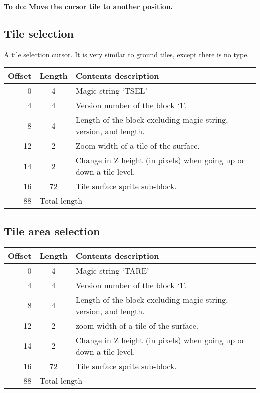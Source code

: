 \documentclass{article}
\begin{document}
\textbf{To do: Move the cursor tile to another position.}

\subsection{Tile selection}
A tile selection cursor. It is very similar to ground tiles, except there is
no type.

\begin{center}
\begin{tabular}{|r|c|l|} \hline
\textbf{Offset} & \textbf{Length} & \textbf{Contents description} \\ \hline
   0 &  4 & Magic string `TSEL' \\
   4 &  4 & Version number of the block `1'. \\
   8 &  4 & Length of the block excluding magic string, version, and length. \\
  12 &  2 & Zoom-width of a tile of the surface. \\
  14 &  2 & Change in Z height (in pixels) when going up or down a tile level. \\
  16 & 72 & Tile surface sprite sub-block. \\ \hline
  88 & \multicolumn{2}{l|}{Total length} \\ \hline
\end{tabular}
\end{center}

\subsection{Tile area selection}
\begin{center}
\begin{tabular}{|r|c|l|} \hline
\textbf{Offset} & \textbf{Length} & \textbf{Contents description} \\ \hline
   0 &  4 & Magic string `TARE' \\
   4 &  4 & Version number of the block `1'. \\
   8 &  4 & Length of the block excluding magic string, version, and length. \\
  12 &  2 & zoom-width of a tile of the surface. \\
  14 &  2 & Change in Z height (in pixels) when going up or down a tile level. \\
  16 & 72 & Tile surface sprite sub-block. \\ \hline
  88 & \multicolumn{2}{l|}{Total length} \\ \hline
\end{tabular}
\end{center}
\end{document}
